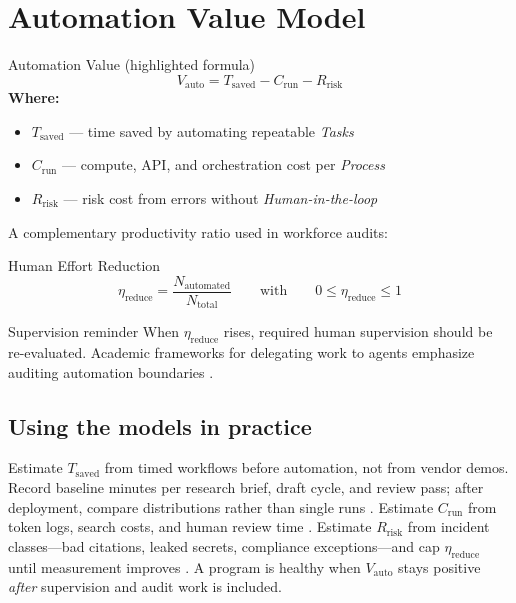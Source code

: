 
\section{Automation Value Model}
\label{sec:automation-formula}

\begin{formulabox}{Automation Value (highlighted formula)}
\[
  V_{\mathrm{auto}} = T_{\mathrm{saved}} - C_{\mathrm{run}} - R_{\mathrm{risk}}
\]
\textbf{Where:}
\begin{itemize}
  \item $T_{\mathrm{saved}}$ --- time saved by automating repeatable \emph{Tasks}
  \item $C_{\mathrm{run}}$ --- compute, API, and orchestration cost per \emph{Process}
  \item $R_{\mathrm{risk}}$ --- risk cost from errors without \emph{Human-in-the-loop}
\end{itemize}
\end{formulabox}

A complementary productivity ratio used in workforce audits:

\begin{formulabox}{Human Effort Reduction}
\[
  \eta_{\mathrm{reduce}} = \frac{N_{\mathrm{automated}}}{N_{\mathrm{total}}}
  \qquad\text{with}\qquad
  0 \leq \eta_{\mathrm{reduce}} \leq 1
\]
\end{formulabox}

\begin{warningbox}{Supervision reminder}
When $\eta_{\mathrm{reduce}}$ rises, required human supervision should be re-evaluated.
Academic frameworks for delegating work to agents emphasize auditing automation boundaries
\cite{arxiv2506workagents}.
\end{warningbox}

\subsection{Using the models in practice}

Estimate $T_{\mathrm{saved}}$ from timed workflows before automation, not from vendor demos.
Record baseline minutes per research brief, draft cycle, and review pass; after deployment,
compare distributions rather than single runs \cite{recomaijobroles}. Estimate
$C_{\mathrm{run}}$ from token logs, search costs, and human review time
\cite{mediumworkflowagents}. Estimate $R_{\mathrm{risk}}$ from incident classes---bad
citations, leaked secrets, compliance exceptions---and cap $\eta_{\mathrm{reduce}}$ until
measurement improves \cite{redditcomplextasks}. A program is healthy when $V_{\mathrm{auto}}$
stays positive \emph{after} supervision and audit work is included.
